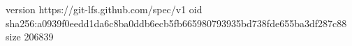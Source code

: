 version https://git-lfs.github.com/spec/v1
oid sha256:a0939f0eedd1da6c8ba0ddb6ecb5fb665980793935bd738fde655ba3df287c88
size 206839
